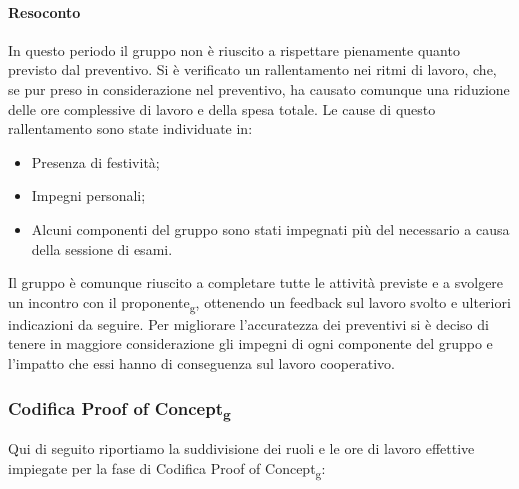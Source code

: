 \paragraph{Resoconto}
In questo periodo il gruppo non è riuscito a rispettare pienamente quanto previsto dal preventivo. Si 
è verificato un rallentamento nei ritmi di lavoro, che, se pur preso in considerazione nel preventivo, ha causato comunque 
una riduzione delle ore complessive di lavoro e della spesa totale. Le cause di questo rallentamento sono state individuate in:
\begin{itemize}
	\item Presenza di festività;
	\item Impegni personali;
	\item Alcuni componenti del gruppo sono stati impegnati più 
	del necessario a causa della sessione di esami.
\end{itemize}
Il gruppo è comunque riuscito a completare tutte le attività previste e a svolgere un incontro 
con il proponente\textsubscript{g}, ottenendo un feedback sul lavoro svolto e ulteriori indicazioni da seguire.
Per migliorare l'accuratezza dei preventivi si è deciso di tenere in maggiore considerazione gli impegni di ogni 
componente del gruppo e l'impatto che essi hanno di conseguenza sul lavoro cooperativo.


\subsubsection{Codifica Proof of Concept\textsubscript{g}}
Qui di seguito riportiamo la suddivisione dei ruoli e le ore di lavoro effettive impiegate per la fase di Codifica Proof of Concept\textsubscript{g}:

